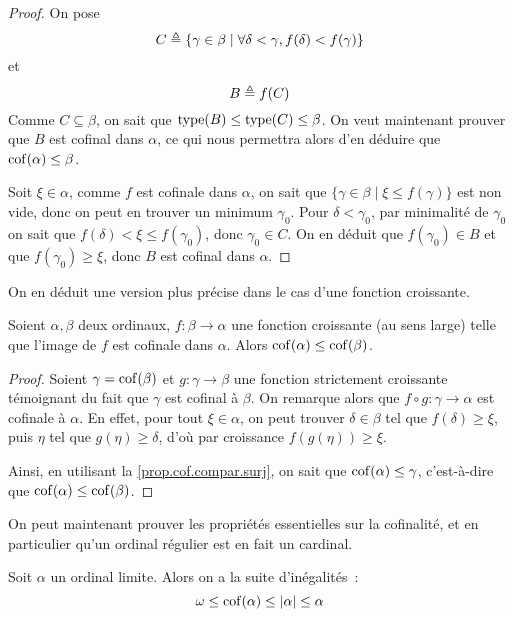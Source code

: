 \begin{proof}
  On pose
  \[C \triangleq \{\gamma \in \beta \mid
  \forall \delta < \gamma, f(\delta) < f(\gamma)\}\]
  et
  \[B \triangleq f(C)\]
  Comme $C\subseteq \beta$, on sait que $\operatorname{type}(B)\leq \operatorname{type}(C) \leq \beta$.
  On veut maintenant prouver que $B$ est cofinal dans $\alpha$, ce qui nous
  permettra alors d'en déduire que $\operatorname{cof}(\alpha) \leq \beta$.

  Soit $\xi \in \alpha$, comme $f$ est cofinale dans $\alpha$, on sait que
  $\{\gamma \in \beta \mid \xi \leq f(\gamma)\}$ est non vide, donc on peut en
  trouver un minimum $\gamma_0$. Pour $\delta < \gamma_0$, par minimalité de
  $\gamma_0$ on sait que $f(\delta) < \xi\leq f(\gamma_0)$, donc
  $\gamma_0 \in C$. On en déduit que $f(\gamma_0)\in B$ et que
  $f(\gamma_0) \geq \xi$, donc $B$ est cofinal dans $\alpha$.
\end{proof}

On en déduit une version plus précise dans le cas d'une fonction croissante.

\begin{proposition}
  Soient $\alpha,\beta$ deux ordinaux, $f : \beta \to \alpha$ une fonction
  croissante (au sens large) telle que l'image de $f$ est cofinale dans
  $\alpha$. Alors $\operatorname{cof}(\alpha)\leq\operatorname{cof}(\beta)$.
\end{proposition}

\begin{proof}
  Soient $\gamma = \operatorname{cof}(\beta)$ et $g : \gamma \to \beta$ une fonction
  strictement croissante témoignant du fait que $\gamma$ est cofinal à $\beta$.
  On remarque alors que $f\circ g : \gamma \to \alpha$ est cofinale à $\alpha$.
  En effet, pour tout $\xi \in \alpha$, on peut trouver $\delta \in \beta$
  tel que $f(\delta) \geq \xi$, puis $\eta$ tel que $g(\eta) \geq \delta$, d'où
  par croissance $f(g(\eta)) \geq \xi$.
  
  Ainsi, en utilisant la \cref{prop.cof.compar.surj}, on sait que
  $\operatorname{cof}(\alpha)\leq \gamma$, c'est-à-dire que $\operatorname{cof}(\alpha)\leq\operatorname{cof}(\beta)$.
\end{proof}

On peut maintenant prouver les propriétés essentielles sur la cofinalité, et en
particulier qu'un ordinal régulier est en fait un cardinal.

\begin{proposition}
  Soit $\alpha$ un ordinal limite. Alors on a la suite d'inégalités~:
  \[\omega\leq \operatorname{cof}(\alpha) \leq |\alpha|\leq \alpha\]
\end{proposition}

